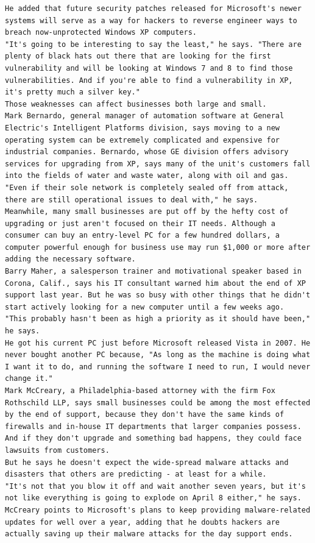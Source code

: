 \documentclass[BTech]{nitgoathesis}
\begin{document}
\begin{lstlisting}[basicstyle=\scriptsize]
He added that future security patches released for Microsoft's newer systems will serve as a way for hackers to reverse engineer ways to breach now-unprotected Windows XP computers.
"It's going to be interesting to say the least," he says. "There are plenty of black hats out there that are looking for the first vulnerability and will be looking at Windows 7 and 8 to find those vulnerabilities. And if you're able to find a vulnerability in XP, it's pretty much a silver key."
Those weaknesses can affect businesses both large and small.
Mark Bernardo, general manager of automation software at General Electric's Intelligent Platforms division, says moving to a new operating system can be extremely complicated and expensive for industrial companies. Bernardo, whose GE division offers advisory services for upgrading from XP, says many of the unit's customers fall into the fields of water and waste water, along with oil and gas.
"Even if their sole network is completely sealed off from attack, there are still operational issues to deal with," he says.
Meanwhile, many small businesses are put off by the hefty cost of upgrading or just aren't focused on their IT needs. Although a consumer can buy an entry-level PC for a few hundred dollars, a computer powerful enough for business use may run $1,000 or more after adding the necessary software.
Barry Maher, a salesperson trainer and motivational speaker based in Corona, Calif., says his IT consultant warned him about the end of XP support last year. But he was so busy with other things that he didn't start actively looking for a new computer until a few weeks ago.
"This probably hasn't been as high a priority as it should have been," he says.
He got his current PC just before Microsoft released Vista in 2007. He never bought another PC because, "As long as the machine is doing what I want it to do, and running the software I need to run, I would never change it."
Mark McCreary, a Philadelphia-based attorney with the firm Fox Rothschild LLP, says small businesses could be among the most effected by the end of support, because they don't have the same kinds of firewalls and in-house IT departments that larger companies possess. And if they don't upgrade and something bad happens, they could face lawsuits from customers.
But he says he doesn't expect the wide-spread malware attacks and disasters that others are predicting - at least for a while.
"It's not that you blow it off and wait another seven years, but it's not like everything is going to explode on April 8 either," he says.
McCreary points to Microsoft's plans to keep providing malware-related updates for well over a year, adding that he doubts hackers are actually saving up their malware attacks for the day support ends.

\end{lstlisting}
\end{document}
